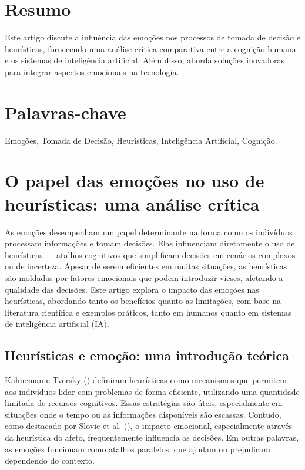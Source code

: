 \documentclass[a4paper,12pt]{report}
\begin{document}
	\section*{Resumo}
	Este artigo discute a influência das emoções nos processos de tomada de decisão e heurísticas, fornecendo uma análise crítica comparativa entre a cognição humana e os sistemas de inteligência artificial. Além disso, aborda soluções inovadoras para integrar aspectos emocionais na tecnologia.
	
	\section*{Palavras-chave}
	Emoções, Tomada de Decisão, Heurísticas, Inteligência Artificial, Cognição.
	
	\newpage
	
	
	\section{O papel das emoções no uso de heurísticas: uma análise crítica}
	
	As emoções desempenham um papel determinante na forma como os indivíduos processam informações e tomam decisões. Elas influenciam diretamente o uso de heurísticas — atalhos cognitivos que simplificam decisões em cenários complexos ou de incerteza. Apesar de serem eficientes em muitas situações, as heurísticas são moldadas por fatores emocionais que podem introduzir vieses, afetando a qualidade das decisões. Este artigo explora o impacto das emoções nas heurísticas, abordando tanto os benefícios quanto as limitações, com base na literatura científica e exemplos práticos, tanto em humanos quanto em sistemas de inteligência artificial (IA).
	
	\subsection{Heurísticas e emoção: uma introdução teórica}
	
	Kahneman e Tversky (\citeyear{kahneman1974}) definiram heurísticas como mecanismos que permitem aos indivíduos lidar com problemas de forma eficiente, utilizando uma quantidade limitada de recursos cognitivos. Essas estratégias são úteis, especialmente em situações onde o tempo ou as informações disponíveis são escassas. Contudo, como destacado por Slovic et al. (\citeyear{slovic2007}), o impacto emocional, especialmente através da heurística do afeto, frequentemente influencia as decisões. Em outras palavras, as emoções funcionam como atalhos paralelos, que ajudam ou prejudicam dependendo do contexto.
	
\end{document}
